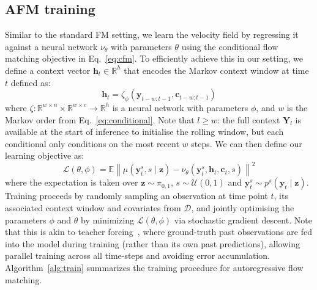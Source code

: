 \documentclass[preprint,12pt,authoryear]{elsarticle}
\newcommand{\oldrev}[1]{#1}
\begin{document}
\subsection{AFM training}
Similar to the standard FM setting, we learn the velocity field by regressing it against a neural network $\nu_\theta$ with parameters $\theta$ using the conditional flow matching objective in Eq.~\eqref{eq:cfm}. To efficiently achieve this in our setting, we define a context vector $\mathbf{h}_t \in \mathbb{R}^h$ that encodes the \oldrev{Markov} context window at time $t$ defined as:
\begin{equation}\label{eq:seq_model}
\mathbf{h}_t = \zeta_\phi(\mathbf{y}_{t-w:t-1}, \mathbf{c}_{t-w:t-1})
\end{equation}
where $\zeta \colon \mathbb{R}^{w \times n} \times \mathbb{R}^{w \times c} \to  \mathbb{R}^h$ is a neural network with parameters $\phi$\oldrev{, and $w$ is the Markov order from Eq.~\eqref{eq:conditional}. Note that $l \ge w$: the full context $\mathbf{Y}_l$ is available at the start of inference to initialise the rolling window, but each conditional only conditions on the most recent $w$ steps}. We can then define our learning objective as: 
\begin{equation}\label{eqn:cfm}
\mathcal{L}(\theta, \phi) = \mathbb{E} \left\| \mu(\mathbf{y}_t^s, s \mid \mathbf{z}) - \nu_\theta(\mathbf{y}_t^s, \mathbf{h}_t, \mathbf{c}_t, s) \right\|^2 
\end{equation}
where the expectation is taken over $\mathbf{z} \sim \pi_{0,1}$, $s \sim \mathcal{U}(0,1)$ and $\mathbf{y}_t^s \sim p^s(\mathbf{y}_t\mid\mathbf{z})$. Training proceeds by randomly sampling an observation at time point $t$, its associated context window and covariates from $\mathcal{D}$, and jointly optimising the parameters $\phi$ and $\theta$ by minimizing $\mathcal{L}(\theta, \phi)$ via stochastic gradient descent. 
Note that this is akin to teacher forcing~\citep{williams1989learning}, where ground-truth past observations are fed into the model during training (rather than its own past predictions), allowing parallel training across all time-steps and avoiding error accumulation. Algorithm~\ref{alg:train} summarizes the training procedure for autoregressive flow matching. 
\end{document}
